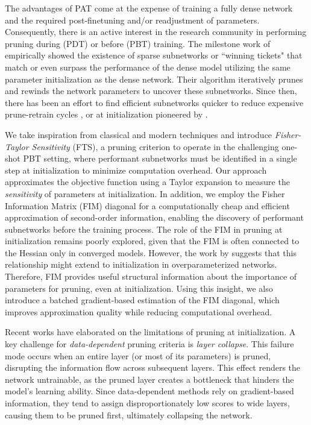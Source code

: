 The advantages of PAT come at the expense of training a fully dense network and the required post-finetuning and/or readjustment of parameters. Consequently, there is an active interest in the research community in performing pruning during (PDT) or before (PBT) training. The milestone work of \citet{frankle2018lottery} empirically showed the existence of sparse subnetworks or ``winning tickets" that match or even surpass the performance of the dense model utilizing the same parameter initialization as the dense network. Their algorithm iteratively prunes and rewinds the network parameters to uncover these subnetworks. Since then, there has been an effort to find efficient subnetworks quicker to reduce expensive prune-retrain cycles \cite{sreenivasan2022rare, you2022supertickets}, or at initialization pioneered by \citet{lee2018snip}.

We take inspiration from classical \cite{lecun1989optimal, hassibi1992second} and modern \cite{lee2018snip, singh2020woodfisher} techniques and introduce \textit{Fisher-Taylor Sensitivity} (FTS), a pruning criterion to operate in the challenging one-shot PBT setting, where performant subnetworks must be identified in a single step at initialization to minimize computation overhead. Our approach approximates the objective function using a Taylor expansion to measure the \textit{sensitivity} of parameters at initialization. In addition, we employ the Fisher Information Matrix (FIM) diagonal for a computationally cheap and efficient approximation of second-order information, enabling the discovery of performant subnetworks before the training process. The role of the FIM in pruning at initialization remains poorly explored, given that the FIM is often connected to the Hessian only in converged models. However, the work by \citet{karakida2019universal} suggests that this relationship might extend to initialization in overparameterized networks. Therefore, FIM provides useful structural information about the importance of parameters for pruning, even at initialization. Using this insight, we also introduce a batched gradient-based estimation of the FIM diagonal, which improves approximation quality while reducing computational overhead.

\label{collapse}
Recent works \cite{tanaka2020pruning, kumar2024no} have elaborated on the limitations of pruning at initialization. A key challenge for \textit{data-dependent} pruning criteria is \textit{layer collapse}. This failure mode occurs when an entire layer (or most of its parameters) is pruned, disrupting the information flow across subsequent layers. This effect renders the network untrainable, as the pruned layer creates a bottleneck that hinders the model's learning ability. Since data-dependent methods rely on gradient-based information, they tend to assign disproportionately low scores to wide layers, causing them to be pruned first, ultimately collapsing the network.

